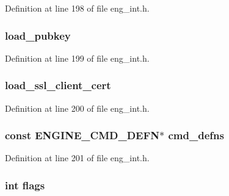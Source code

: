 Definition at line 198 of file eng\+\_\+int.\+h.

\subsubsection[{\texorpdfstring{load\+\_\+pubkey}{load_pubkey}}]{ load\+\_\+pubkey}\hypertarget{structengine__st_ab3f26bfe357c673e3fdf751ea7a79c35}{}\label{structengine__st_ab3f26bfe357c673e3fdf751ea7a79c35}


Definition at line 199 of file eng\+\_\+int.\+h.

\subsubsection[{\texorpdfstring{load\+\_\+ssl\+\_\+client\+\_\+cert}{load_ssl_client_cert}}]{ load\+\_\+ssl\+\_\+client\+\_\+cert}\hypertarget{structengine__st_ae1f1240d9536dd9d29da9c1c4143dda2}{}\label{structengine__st_ae1f1240d9536dd9d29da9c1c4143dda2}


Definition at line 200 of file eng\+\_\+int.\+h.

\subsubsection[{\texorpdfstring{cmd\+\_\+defns}{cmd_defns}}]{\setlength{\rightskip}{0pt plus 5cm}const {\bf E\+N\+G\+I\+N\+E\+\_\+\+C\+M\+D\+\_\+\+D\+E\+FN}$\ast$ cmd\+\_\+defns}\hypertarget{structengine__st_a51557038eef4ba8431f9c56576400e91}{}\label{structengine__st_a51557038eef4ba8431f9c56576400e91}


Definition at line 201 of file eng\+\_\+int.\+h.

\subsubsection[{\texorpdfstring{flags}{flags}}]{\setlength{\rightskip}{0pt plus 5cm}int flags}\hypertarget{structengine__st_ac8bf36fe0577cba66bccda3a6f7e80a4}{}\label{structengine__st_ac8bf36fe0577cba66bccda3a6f7e80a4}


